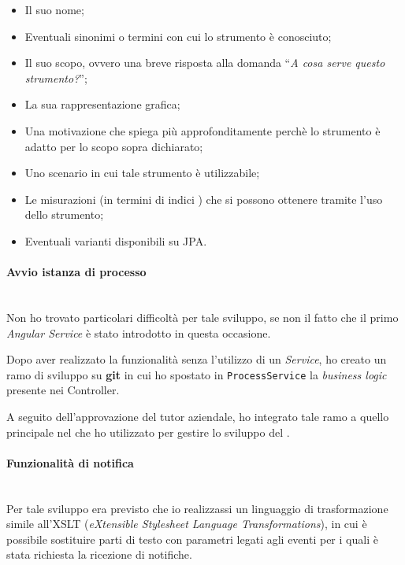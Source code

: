 \begin{itemize}
\item Il suo nome;
\item Eventuali sinonimi o termini con cui lo strumento è conosciuto;
\item Il suo scopo, ovvero una breve risposta alla domanda ``\emph{A cosa
  serve questo strumento?}'';
\item La sua rappresentazione grafica;
\item Una motivazione che spiega più approfonditamente perchè lo strumento è
  adatto per lo scopo sopra dichiarato;
\item Uno scenario in cui tale strumento è utilizzabile;
\item Le misurazioni (in termini di indici ) che si possono
  ottenere tramite l'uso dello strumento;
\item Eventuali varianti disponibili su JPA.
\end{itemize}

\paragraph{Avvio istanza di processo} \mbox{} \\

Non ho trovato particolari difficoltà per tale sviluppo, se non il fatto che
il primo \emph{Angular Service} è stato introdotto in questa occasione.

Dopo aver realizzato la funzionalità senza l'utilizzo di un \emph{Service}, ho
creato un ramo di sviluppo su \textbf{git} in cui ho spostato in
\texttt{ProcessService} la \emph{business logic} presente nei Controller.

A seguito dell'approvazione del tutor aziendale, ho integrato tale ramo a
quello principale nel  che ho utilizzato per gestire lo
sviluppo del \FREND{}.

\paragraph{Funzionalità di notifica} \mbox{} \\

Per tale sviluppo era previsto che io realizzassi un linguaggio di
trasformazione simile all'XSLT (\emph{eXtensible Stylesheet Language
Transformations}), in cui è possibile sostituire parti di testo con parametri
legati agli eventi per i quali è stata richiesta la ricezione di notifiche.

